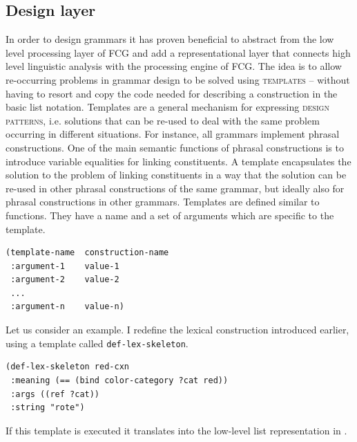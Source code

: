 \subsection{Design layer}
In order to design grammars it has proven beneficial
to abstract from the low level processing layer of FCG and 
add a representational layer that connects high level linguistic 
analysis with the processing engine of FCG.
The idea is to allow re-occurring problems in grammar design
to be solved using \textsc{templates} -- without having
to resort and copy the code needed for describing a construction
in the basic list notation. Templates 
are a general mechanism for expressing \textsc{design patterns},
i.e. solutions that can be re-used to deal with the
same problem occurring in different situations. For instance,
all grammars implement phrasal constructions. One 
of the main semantic functions of phrasal constructions 
is to introduce variable equalities for linking constituents.
A template encapsulates the solution to the problem 
of linking constituents in a way that the solution can be re-used in other
phrasal constructions of the same grammar, but ideally also for phrasal constructions in other grammars.
Templates are defined similar to functions. They
have a name and a set of arguments which are specific
to the template.
\ea\label{e:template-syntax}
\begin{lstlisting}[columns=fixed]
(template-name	construction-name
 :argument-1	value-1
 :argument-2	value-2
 ...
 :argument-n	value-n)
\end{lstlisting}\z

Let us consider an example. I redefine the lexical construction introduced earlier,
using a template called 
{\footnotesize\tt def-lex-skeleton}.
\ea\label{e:def-lex-rot}
\begin{lstlisting}
(def-lex-skeleton red-cxn 
 :meaning (== (bind color-category ?cat red)) 
 :args ((ref ?cat))
 :string "rote")
\end{lstlisting}\z
If this template is executed it translates into the 
low-level list representation in . 

